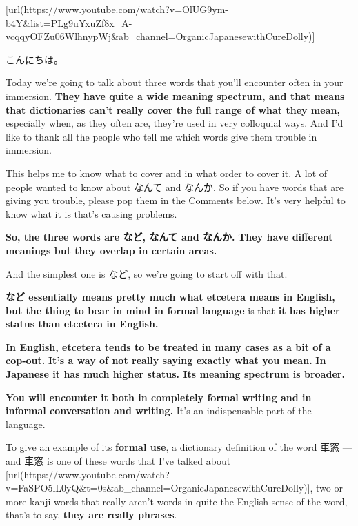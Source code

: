 \startsectionlevel[title={{\bf 82. なんて、なんか、など: 3 Common words clarified.}},reference={なんてなんかなど-3-common-words-clarified.}]

[url(https://www.youtube.com/watch?v=OlUG9ym-b4Y&list=PLg9uYxuZf8x_A-vcqqyOFZu06WlhnypWj&ab_channel=OrganicJapanesewithCureDolly)]

こんにちは。

Today we're going to talk about three words that you'll encounter often in your immersion. {\bf They have quite a wide meaning spectrum, and that means that dictionaries can't really cover the full range of what they mean,} especially when, as they often are, they're used in very colloquial ways. And I'd like to thank all the people who tell me which words give them trouble in immersion.

This helps me to know what to cover and in what order to cover it. A lot of people wanted to know about なんて and なんか. So if you have words that are giving you trouble, please pop them in the Comments below. It's very helpful to know what it is that's causing problems.

{\bf So, the three words are など, なんて and なんか.} {\bf They have different meanings but they overlap in certain areas.}

{}

And the simplest one is など, so we're going to start off with that.

\startsectionlevel[title={など},reference={など}]

{\bf など essentially means pretty much what etcetera means in English, but the thing to bear in mind in formal language} is that {\bf it has higher status than etcetera in English.}

{}

{\bf In English, etcetera tends to be treated in many cases as a bit of a cop-out.} {\bf It's a way of not really saying exactly what you mean.} {\bf In Japanese it has much higher status. Its meaning spectrum is broader.}

{\bf You will encounter it both in completely formal writing and in informal conversation and writing.} It's an indispensable part of the language.

\thinrule

To give an example of its {\bf formal use}, a dictionary definition of the word 車窓 --- and 車窓 is one of these words that I've talked about [url(https://www.youtube.com/watch?v=FaSPO5lL0yQ&t=0s&ab_channel=OrganicJapanesewithCureDolly)], two-or-more-kanji words that really aren't words in quite the English sense of the word, that's to say, {\bf they are really phrases}.

